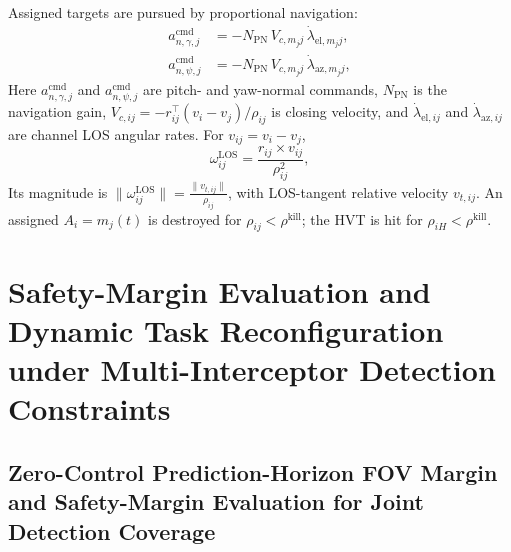 \documentclass{cja}
\begin{document}
Assigned targets are pursued by proportional navigation:
\begin{equation}
\begin{aligned}
a_{n,\gamma,j}^{\mathrm{cmd}}
&=-N_{\mathrm{PN}}\,V_{c,m_j j}\,\dot\lambda_{\mathrm{el},m_j j},\\
a_{n,\psi,j}^{\mathrm{cmd}}
&=-N_{\mathrm{PN}}\,V_{c,m_j j}\,\dot\lambda_{\mathrm{az},m_j j},
\end{aligned}
\label{eq:def-guid-pn}
\end{equation}
Here $a_{n,\gamma,j}^{\mathrm{cmd}}$ and $a_{n,\psi,j}^{\mathrm{cmd}}$ are pitch- and yaw-normal commands, $N_{\mathrm{PN}}$ is the navigation gain, $V_{c,ij}=-r_{ij}^\top(v_i-v_j)/\rho_{ij}$ is closing velocity, and $\dot\lambda_{\mathrm{el},ij}$ and $\dot\lambda_{\mathrm{az},ij}$ are channel LOS angular rates. For $v_{ij}=v_i-v_j$,
\begin{equation}
\omega_{ij}^{\mathrm{LOS}} = \frac{r_{ij}\times v_{ij}}{\rho_{ij}^2},
\label{eq:omega_ij_def}
\end{equation}
Its magnitude is $\|\omega_{ij}^{\mathrm{LOS}}\| = \frac{\|v_{t,ij}\|}{\rho_{ij}}$, with LOS-tangent relative velocity $v_{t,ij}$. An assigned $A_i=m_j(t)$ is destroyed for $\rho_{ij}<\rho^{\mathrm{kill}}$; the HVT is hit for $\rho_{iH}<\rho^{\mathrm{kill}}$.

\section{Safety-Margin Evaluation and Dynamic Task Reconfiguration under Multi-Interceptor Detection Constraints}

\subsection{Zero-Control Prediction-Horizon FOV Margin and Safety-Margin Evaluation for Joint Detection Coverage}
\end{document}

